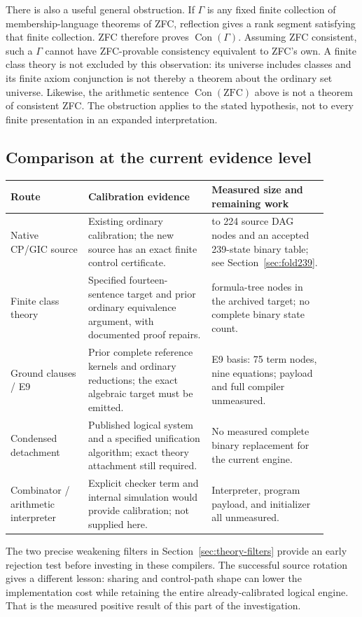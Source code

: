 There is also a useful general obstruction.  If $\Gamma$ is any fixed
finite collection of membership-language theorems of ZFC, reflection gives
a rank segment satisfying that finite collection.  ZFC therefore proves
$\operatorname{Con}(\Gamma)$.  Assuming ZFC consistent, such a $\Gamma$
cannot have ZFC-provable consistency equivalent to ZFC's own.  A finite
class theory is not excluded by this observation: its universe includes
classes and its finite axiom conjunction is not thereby a theorem about
the ordinary set universe.  Likewise, the arithmetic sentence
$\operatorname{Con}(\mathrm{ZFC})$ above is not a theorem of consistent
ZFC.  The obstruction applies to the stated hypothesis, not to every
finite presentation in an expanded interpretation.

\subsection{Comparison at the current evidence level}

\begin{center}\small
\begin{tabular}{>{\raggedright\arraybackslash}p{0.22\linewidth}>{\raggedright\arraybackslash}p{0.35\linewidth}>{\raggedright\arraybackslash}p{0.33\linewidth}}
Route&Calibration evidence&Measured size and remaining work\\\hline
Native CP/GIC source&Existing ordinary calibration; the new source has an
exact finite control certificate.&225 to 224 source DAG nodes and an
accepted 239-state binary table; see Section~\ref{sec:fold239}.\\[3pt]
Finite class theory&Specified fourteen-sentence target and prior ordinary
equivalence argument, with documented proof repairs.&752 formula-tree
nodes in the archived target; no complete binary state count.\\[3pt]
Ground clauses / E9&Prior complete reference kernels and ordinary
reductions; the exact algebraic target must be emitted.&E9 basis: 75 term
nodes, nine equations; payload and full compiler unmeasured.\\[3pt]
Condensed detachment&Published logical system and a specified unification
algorithm; exact theory attachment still required.&No measured complete
binary replacement for the current engine.\\[3pt]
Combinator / arithmetic interpreter&Explicit checker term and internal
simulation would provide calibration; not supplied here.&Interpreter,
program payload, and initializer all unmeasured.
\end{tabular}
\end{center}

The two precise weakening filters in Section~\ref{sec:theory-filters}
provide an early rejection test before investing in these compilers.
The successful source rotation gives a different lesson: sharing and
control-path shape can lower the implementation cost while retaining the
entire already-calibrated logical engine.  That is the measured positive
result of this part of the investigation.
